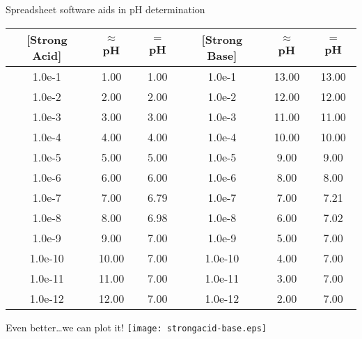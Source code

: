 \documentclass[notes=hide]{beamer}
\begin{document}
\clearpage

\begin{frame}[shrink]{Spreadsheet software aids in pH determination}
	\begin{tabular} {S[table-format=1.1e-2] *{2}{S[table-format=2.2]} || S[table-format=1.1e-2]
		*{2}{S[table-format=2.2]}}
		\toprule
		{[Strong Acid]} & {$\approx$ pH} & {$=$ pH} & {[Strong Base]} & {$\approx$ pH} & {$=$ pH} \\ \midrule
		1.0e-1 & 1.00 & 1.00   & 1.0e-1 & 13.00 & 13.00 \\
		1.0e-2 & 2.00 & 2.00   & 1.0e-2 & 12.00 & 12.00 \\
		1.0e-3 & 3.00 & 3.00   & 1.0e-3 & 11.00 & 11.00 \\
		1.0e-4 & 4.00 & 4.00   & 1.0e-4 & 10.00 & 10.00 \\
		1.0e-5 & 5.00 & 5.00   & 1.0e-5 & 9.00 & 9.00   \\
		1.0e-6 & 6.00 & 6.00   & 1.0e-6 & 8.00 & 8.00   \\
		1.0e-7 & 7.00 & 6.79   & 1.0e-7 & 7.00 & 7.21   \\
		1.0e-8 & 8.00 & 6.98   & 1.0e-8 & 6.00 & 7.02   \\
		1.0e-9 & 9.00 & 7.00   & 1.0e-9 & 5.00 & 7.00   \\
		1.0e-10 & 10.00 & 7.00 & 1.0e-10 & 4.00 & 7.00  \\
		1.0e-11 & 11.00 & 7.00 & 1.0e-11 & 3.00 & 7.00  \\
		1.0e-12 & 12.00 & 7.00 & 1.0e-12 & 2.00 & 7.00  \\
		\bottomrule
	\end{tabular}
\end{frame}


\begin{frame}{Even better\ldots we can plot it!}
	\centering
	\texttt{[image: strongacid-base.eps]}
\end{frame}
\end{document}

